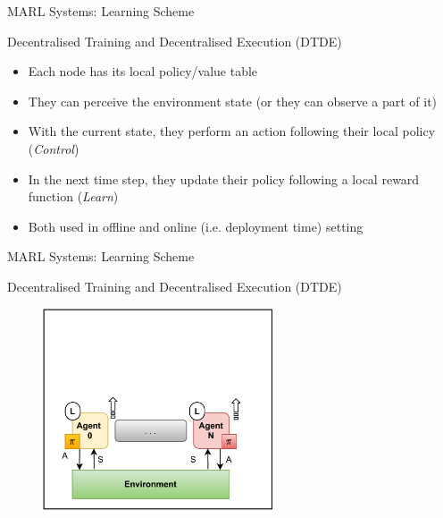 \documentclass[presentation]{beamer}\mode<presentation>{\usetheme{AMSBolognaFC}}
\begin{document}
\begin{frame}{MARL Systems: Learning Scheme}
	
	\begin{exampleblock}{Decentralised Training and Decentralised Execution (DTDE)}
		\begin{itemize}
			\item Each node has its local policy/value table
			\item They can perceive the environment state (or they can observe a part of it)
			\item With the current state, they perform an action following their local policy (\emph{Control})
			\item In the next time step, they update their policy following a local reward function (\emph{Learn})
			\item Both used in offline and online (i.e. deployment time) setting
		\end{itemize}
	\end{exampleblock}
\end{frame}


\begin{frame}{MARL Systems: Learning Scheme}
	\begin{exampleblock}{Decentralised Training and Decentralised Execution (DTDE)}
		\begin{figure}
			\includegraphics[height=6cm]{img/learning-scheme-dtde.pdf}
		\end{figure}
	\end{exampleblock}
\end{frame}
\end{document}

